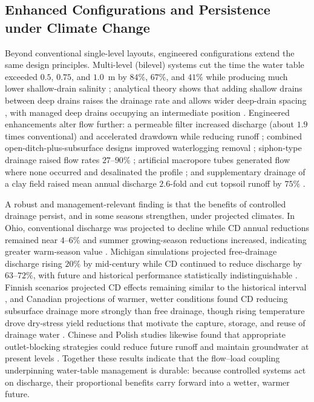 \documentclass[11pt]{article}
\begin{document}
\subsection{Enhanced Configurations and Persistence under Climate Change}

Beyond conventional single-level layouts, engineered configurations extend the
same design principles. Multi-level (bilevel) systems cut the time the water
table exceeded $0.5$, $0.75$, and $1.0$~m by $84\%$, $67\%$, and $41\%$ while
producing much lower shallow-drain salinity \parencite{Hornbuckle2007};
analytical theory shows that adding shallow drains between deep drains raises
the drainage rate and allows wider deep-drain spacing
\parencite{Hornbuckle2012}, with managed deep drains occupying an intermediate
position \parencite{Ayars2006b,Christen2001b}. Engineered enhancements alter
flow further: a permeable filter increased discharge (about $1.9$ times
conventional) and accelerated drawdown while reducing runoff
\parencite{Tao2016,Tao2017}; combined open-ditch-plus-subsurface designs
improved waterlogging removal \parencite{Ren2021,Tao2025}; siphon-type drainage
raised flow rates $27$--$90\%$ \parencite{Ren2023}; artificial macropore tubes
generated flow where none occurred and desalinated the profile
\parencite{Chen2021}; and supplementary drainage of a clay field raised mean
annual discharge $2.6$-fold and cut topsoil runoff by $75\%$
\parencite{Häggblom2019}.

A robust and management-relevant finding is that the benefits of controlled
drainage persist, and in some seasons strengthen, under projected climates. In
Ohio, conventional discharge was projected to decline while CD annual
reductions remained near $4$--$6\%$ and summer growing-season reductions
increased, indicating greater warm-season value \parencite{Pease2017}. Michigan
simulations projected free-drainage discharge rising $20\%$ by mid-century while
CD continued to reduce discharge by $63$--$72\%$, with future and historical
performance statistically indistinguishable \parencite{BinShokrana2023}.
Finnish scenarios projected CD effects remaining similar to the historical
interval \parencite{Salla2022}, and Canadian projections of warmer, wetter
conditions found CD reducing subsurface drainage more strongly than free
drainage, though rising temperature drove dry-stress yield reductions that
motivate the capture, storage, and reuse of drainage water
\parencite{Ndulue2024,Gunn2018}. Chinese and Polish studies likewise found that
appropriate outlet-blocking strategies could reduce future runoff and maintain
groundwater at present levels \parencite{Awad2021,Sojka2020}. Together these
results indicate that the flow--load coupling underpinning water-table
management is durable: because controlled systems act on discharge, their
proportional benefits carry forward into a wetter, warmer future.

\printbibliography
\end{document}
